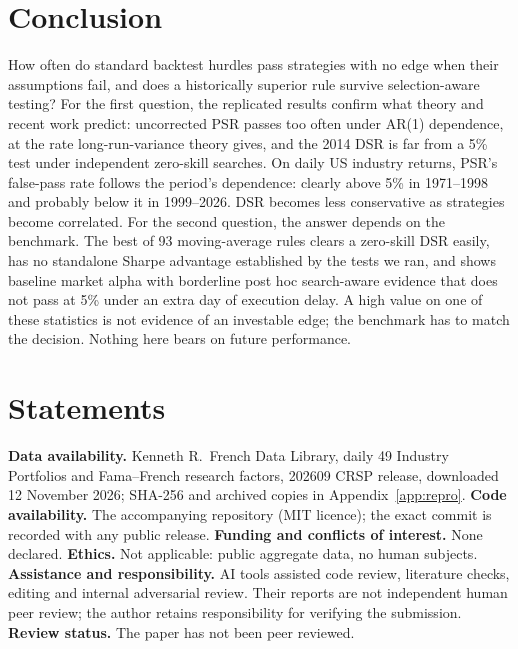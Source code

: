 \documentclass[11pt,a4paper]{article}
\begin{document}
\section{Conclusion}\label{sec:conclusion}

How often do standard backtest hurdles pass strategies with no edge when their assumptions fail, and does a historically superior rule survive selection-aware testing? For the first question, the replicated results confirm what theory and recent work predict: uncorrected PSR passes too often under AR(1) dependence, at the rate long-run-variance theory gives, and the 2014 DSR is far from a 5\% test under independent zero-skill searches. On daily US industry returns, PSR's false-pass rate follows the period's dependence: clearly above 5\% in 1971--1998 and probably below it in 1999--2026. DSR becomes less conservative as strategies become correlated. For the second question, the answer depends on the benchmark. The best of 93 moving-average rules clears a zero-skill DSR easily, has no standalone Sharpe advantage established by the tests we ran, and shows baseline market alpha with borderline post hoc search-aware evidence that does not pass at 5\% under an extra day of execution delay. A high value on one of these statistics is not evidence of an investable edge; the benchmark has to match the decision. Nothing here bears on future performance.

\section*{Statements}
\textbf{Data availability.} Kenneth R.\ French Data Library, daily 49 Industry Portfolios and Fama--French research factors, 202609 CRSP release, downloaded 12 November 2026; SHA-256 and archived copies in Appendix~\ref{app:repro}. \textbf{Code availability.} The accompanying repository (MIT licence); the exact commit is recorded with any public release. \textbf{Funding and conflicts of interest.} None declared. \textbf{Ethics.} Not applicable: public aggregate data, no human subjects. \textbf{Assistance and responsibility.} AI tools assisted code review, literature checks, editing and internal adversarial review. Their reports are not independent human peer review; the author retains responsibility for verifying the submission. \textbf{Review status.} The paper has not been peer reviewed.




\appendix
\end{document}
